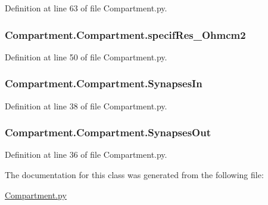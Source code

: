Definition at line 63 of file Compartment.\-py.

\hypertarget{class_compartment_1_1_compartment_aed6025b5335c2ce41d37c02fd3c1c042}{
\subsubsection[{specif\-Res\-\_\-\-Ohmcm2}]{\setlength{\rightskip}{0pt plus 5cm}Compartment.\-Compartment.\-specif\-Res\-\_\-\-Ohmcm2}}\label{class_compartment_1_1_compartment_aed6025b5335c2ce41d37c02fd3c1c042}


Definition at line 50 of file Compartment.\-py.

\hypertarget{class_compartment_1_1_compartment_abe41aff3bffed80f4b848bd14763d506}{
\subsubsection[{Synapses\-In}]{\setlength{\rightskip}{0pt plus 5cm}Compartment.\-Compartment.\-Synapses\-In}}\label{class_compartment_1_1_compartment_abe41aff3bffed80f4b848bd14763d506}


Definition at line 38 of file Compartment.\-py.

\hypertarget{class_compartment_1_1_compartment_a85d64ebf548276c873501d2dc3489ceb}{
\subsubsection[{Synapses\-Out}]{\setlength{\rightskip}{0pt plus 5cm}Compartment.\-Compartment.\-Synapses\-Out}}\label{class_compartment_1_1_compartment_a85d64ebf548276c873501d2dc3489ceb}


Definition at line 36 of file Compartment.\-py.



The documentation for this class was generated from the following file\-:\begin{DoxyCompactItemize}
\item 
\hyperlink{_compartment_8py}{Compartment.\-py}\end{DoxyCompactItemize}
